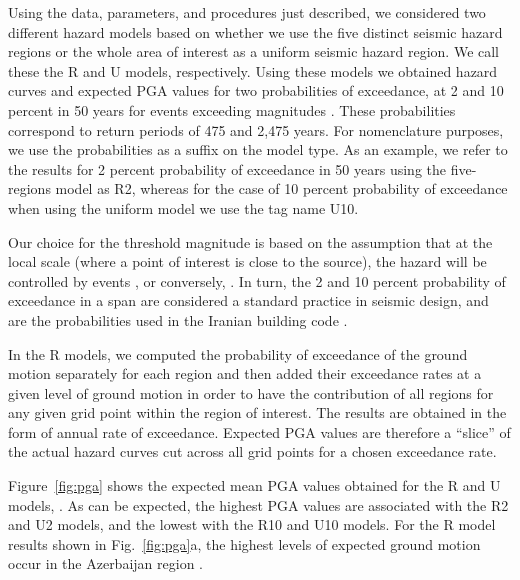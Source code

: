 Using the data, parameters, and procedures just described, we considered two different hazard models based on whether we use the five distinct seismic hazard regions or the whole area of interest as a uniform seismic hazard region. We call these the R and U models, respectively. Using these models we obtained hazard curves and expected PGA values for two probabilities of exceedance, at 2 and 10 percent in 50 years for events exceeding magnitudes . These probabilities correspond to return periods of 475 and 2,475 years. For nomenclature purposes, we use the probabilities as a suffix on the model type. As an example, we refer to the results for 2 percent probability of exceedance in 50 years using the five-regions model as R2, whereas for the case of 10 percent probability of exceedance when using the uniform model we use the tag name U10.

Our choice for the threshold magnitude is based on the assumption that at the local scale (where a point of interest is close to the source), the hazard will be controlled by events , or conversely, . In turn, the 2 and 10 percent probability of exceedance in a  span are considered a standard practice in seismic design, and are the probabilities used in the Iranian building code \citep{BHRC2014}.

In the R models, we computed the probability of exceedance of the ground motion separately for each region and then added their exceedance rates at a given level of ground motion in order to have the contribution of all regions for any given grid point within the region of interest. The results are obtained in the form of annual rate of exceedance. Expected PGA values are therefore a ``slice'' of the actual hazard curves cut across all grid points for a chosen exceedance rate.

Figure~\ref{fig:pga} shows the expected mean PGA values obtained for the R and U models, . As can be expected, the highest PGA values are associated with the R2 and U2 models, and the lowest with the R10 and U10 models. For the R model results shown in Fig.~\ref{fig:pga}a, the highest levels of expected ground motion occur in the Azerbaijan region .

